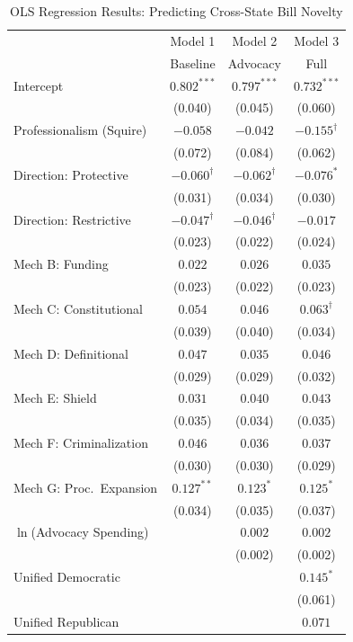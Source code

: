 \begin{table}[htbp]
\centering
\caption{OLS Regression Results: Predicting Cross-State Bill Novelty}
\label{tab:regression}
\small
\begin{tabular}{@{}lccc@{}}
\toprule
 & Model 1 & Model 2 & Model 3 \\
 & Baseline & Advocacy & Full \\
\midrule
Intercept
  & $0.802^{***}$ & $0.797^{***}$ & $0.732^{***}$ \\
  & (0.040) & (0.045) & (0.060) \\[6pt]
Professionalism (Squire)
  & $-0.058$ & $-0.042$ & $-0.155^{\dagger}$ \\
  & (0.072) & (0.084) & (0.062) \\[6pt]
Direction: Protective
  & $-0.060^{\dagger}$ & $-0.062^{\dagger}$ & $-0.076^{*}$ \\
  & (0.031) & (0.034) & (0.030) \\[6pt]
Direction: Restrictive
  & $-0.047^{\dagger}$ & $-0.046^{\dagger}$ & $-0.017$ \\
  & (0.023) & (0.022) & (0.024) \\[6pt]
Mech B: Funding
  & $0.022$ & $0.026$ & $0.035$ \\
  & (0.023) & (0.022) & (0.023) \\[6pt]
Mech C: Constitutional
  & $0.054$ & $0.046$ & $0.063^{\dagger}$ \\
  & (0.039) & (0.040) & (0.034) \\[6pt]
Mech D: Definitional
  & $0.047$ & $0.035$ & $0.046$ \\
  & (0.029) & (0.029) & (0.032) \\[6pt]
Mech E: Shield
  & $0.031$ & $0.040$ & $0.043$ \\
  & (0.035) & (0.034) & (0.035) \\[6pt]
Mech F: Criminalization
  & $0.046$ & $0.036$ & $0.037$ \\
  & (0.030) & (0.030) & (0.029) \\[6pt]
Mech G: Proc.\ Expansion
  & $0.127^{**}$ & $0.123^{*}$ & $0.125^{*}$ \\
  & (0.034) & (0.035) & (0.037) \\[6pt]
$\ln$(Advocacy Spending)
  & & $0.002$ & $0.002$ \\
  & & (0.002) & (0.002) \\[6pt]
Unified Democratic
  & & & $0.145^{*}$ \\
  & & & (0.061) \\[6pt]
Unified Republican
  & & & $0.071$ \\

\end{tabular}
\end{table}

